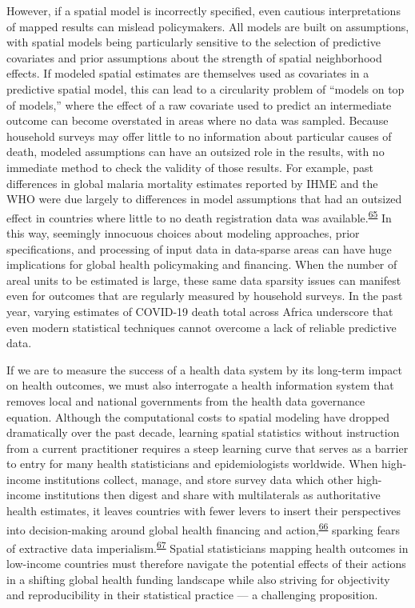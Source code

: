 \documentclass[
]{article}
\begin{document}
However, if a spatial model is incorrectly specified, even cautious interpretations of mapped results can mislead policymakers. All models are built on assumptions, with spatial models being particularly sensitive to the selection of predictive covariates and prior assumptions about the strength of spatial neighborhood effects. If modeled spatial estimates are themselves used as covariates in a predictive spatial model, this can lead to a circularity problem of ``models on top of models,'' where the effect of a raw covariate used to predict an intermediate outcome can become overstated in areas where no data was sampled. Because household surveys may offer little to no information about particular causes of death, modeled assumptions can have an outsized role in the results, with no immediate method to check the validity of those results. For example, past differences in global malaria mortality estimates reported by IHME and the WHO were due largely to differences in model assumptions that had an outsized effect in countries where little to no death registration data was available.\textsuperscript{\protect\hyperlink{ref-Tichenor2020}{65}} In this way, seemingly innocuous choices about modeling approaches, prior specifications, and processing of input data in data-sparse areas can have huge implications for global health policymaking and financing. When the number of areal units to be estimated is large, these same data sparsity issues can manifest even for outcomes that are regularly measured by household surveys. In the past year, varying estimates of COVID-19 death total across Africa underscore that even modern statistical techniques cannot overcome a lack of reliable predictive data.

If we are to measure the success of a health data system by its long-term impact on health outcomes, we must also interrogate a health information system that removes local and national governments from the health data governance equation. Although the computational costs to spatial modeling have dropped dramatically over the past decade, learning spatial statistics without instruction from a current practitioner requires a steep learning curve that serves as a barrier to entry for many health statisticians and epidemiologists worldwide. When high-income institutions collect, manage, and store survey data which other high-income institutions then digest and share with multilaterals as authoritative health estimates, it leaves countries with fewer levers to insert their perspectives into decision-making around global health financing and action,\textsuperscript{\protect\hyperlink{ref-Cinnamon2020a}{66}} sparking fears of extractive data imperialism.\textsuperscript{\protect\hyperlink{ref-Marchais2020}{67}} Spatial statisticians mapping health outcomes in low-income countries must therefore navigate the potential effects of their actions in a shifting global health funding landscape while also striving for objectivity and reproducibility in their statistical practice --- a challenging proposition.
\end{document}
